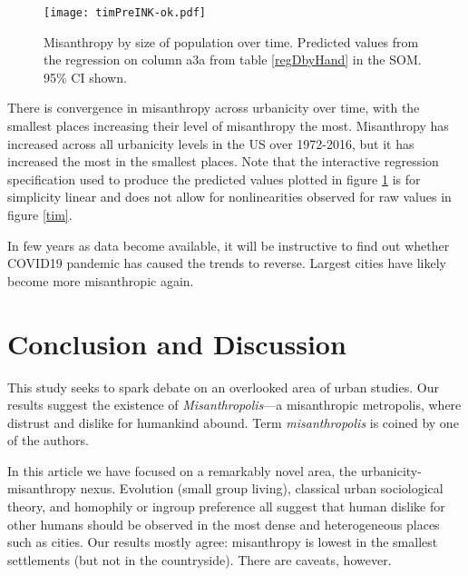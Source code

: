\documentclass[11pt, letterpaper]{article}
\begin{document}
\begin{spacing}{1.4}
\begin{figure}[H]
  \texttt{[image: timPreINK-ok.pdf]}\centering
\caption{Misanthropy by size of population over time. Predicted values from the regression on column a3a from table \ref{regDbyHand} in the SOM. 95\% CI shown.}\label{timPre}%
\end{figure}

There is convergence in misanthropy across urbanicity over time, with the
smallest places increasing their level of misanthropy the most. Misanthropy has
increased across all urbanicity levels in the US over 1972-2016, but it has
increased the most
in the smallest places. Note that the interactive regression specification used to produce the
predicted values plotted in figure \ref{timPre} is for simplicity linear and does not allow for
nonlinearities observed for raw values in figure \ref{tim}.


In few years as data become available, it will be instructive to find out
whether COVID19 pandemic has caused the trends to reverse. Largest cities have
likely become more misanthropic again.


\section*{Conclusion and Discussion}

This study seeks to spark debate on an overlooked area of urban studies. 
 Our results suggest the existence of
\emph{Misanthropolis}---a misanthropic metropolis,  where distrust and dislike for humankind
abound. {Term \emph{misanthropolis} is coined by one of the authors.}


In this article we have focused on a remarkably novel area, the urbanicity-misanthropy
nexus. %
Evolution  (small group living),  classical urban sociological theory, and homophily or ingroup preference all suggest that human dislike for other humans should be observed in the most dense and heterogeneous places such as cities. Our results mostly agree: misanthropy is lowest in the smallest settlements (but not in the countryside). There are caveats, however. 


\end{spacing}
\end{document}
